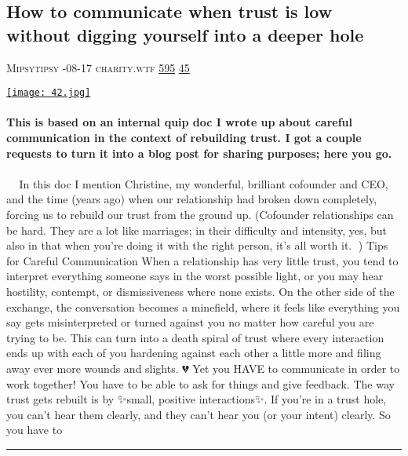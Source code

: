 \documentclass[10pt,a4paper]{article}
\begin{document}
\begin{multicols}{2}
\begin{minipage}{\linewidth}
\subsection{How to communicate when trust is low without digging yourself into a deeper hole}
\textsc{\footnotesize
{\scriptsize\faUser}\space 
Mipsytipsy 
{\scriptsize\faCalendar}-08-17 
{\scriptsize\faGlobe}\space 
charity.wtf 
{\scriptsize\faThumbsOUp}\space 
\href{http://news.ycombinator.com/item?id=37166946\&utm\_term=comment}{595} 
{\scriptsize\faComments}\space 
\href{http://news.ycombinator.com/item?id=37166946\&utm\_term=comment}{45} 
}
\par\medskip\noindent
\href{https://charity.wtf/2023/08/17/how-to-communicate-when-trust-is-low-without-digging-yourself-into-a-deeper-hole/?utm\_source=hackernewsletter\&utm\_medium=email\&utm\_term=working}{
    \texttt{[image: 42.jpg]}
}
\end{minipage}
\paragraph{}
\textbf{This is based on an internal quip doc I wrote up about careful communication in the context of rebuilding trust. I got a couple requests to turn it into a blog post for sharing purposes; here you go.}
\paragraph{}
🌈✨🥂
In this doc I mention Christine, my wonderful, brilliant cofounder and CEO, and the time (years ago) when our relationship had broken down completely, forcing us to rebuild our trust from the ground up.
(Cofounder relationships can be hard. They are a lot like marriages; in their difficulty and intensity, yes, but also in that when you’re doing it with the right person, it’s all worth it. 💜)
Tips for Careful Communication
When a relationship has very little trust, you tend to interpret everything someone says in the worst possible light, or you may hear hostility, contempt, or dismissiveness where none exists. On the other side of the exchange, the conversation becomes a minefield, where it feels like everything you say gets misinterpreted or turned against you no matter how careful you are trying to be. This can turn into a death spiral of trust where every interaction ends up with each of you hardening against each other a little more and filing away ever more wounds and slights. 💔
Yet you HAVE to communicate in order to work together! You have to be able to ask for things and give feedback.
The way trust gets rebuilt is by ✨small, positive interactions✨. If you’re in a trust hole, you can’t hear them clearly, and they can’t hear you (or your intent) clearly. So you have to 
\par\noindent\textcolor{red}{\rule{\linewidth}{0.2mm}}
\vfill
\null
\noindent\begin{minipage}{\linewidth}

\end{minipage}
\end{multicols}
\end{document}
